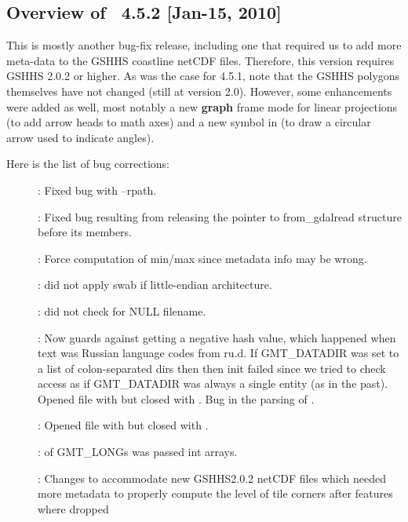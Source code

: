 \subsection{Overview of \gmt\ 4.5.2 [Jan-15, 2010]}

This is mostly another bug-fix release, including one that required us to add more meta-data
to the GSHHS coastline netCDF files.  Therefore, this version requires GSHHS 2.0.2 or higher.
As was the case for 4.5.1, note that the GSHHS polygons themselves have not changed (still at version 2.0).
However, some enhancements were added as well, most notably a new {\bf graph} frame mode for linear
projections (to add arrow heads to math axes) and a new symbol in  (to draw a
circular arrow used to indicate angles).

Here is the list of bug corrections:
\begin{description}
	\item []:	Fixed bug with --rpath.
	\item []:	Fixed bug resulting from releasing the pointer to from\_gdalread
		structure before its members.
	\item []:	Force computation of min/max since metadata info may be wrong.
	\item []:	 did not apply swab if little-endian architecture.
	\item []:	 did not check for NULL filename.
	\item []:	Now guards against getting a negative hash value, which happened
		when text was Russian language codes from ru.d.  If GMT\_DATADIR was set to a list of colon-separated dirs
		then then init failed since we tried to check access as
		if GMT\_DATADIR was always a single entity (as in the past). Opened file with  but closed with .
		Bug in the parsing of .
	\item []:	Opened file with  but closed with .
	\item []:	 of GMT\_LONGs was passed int arrays.
	\item []:		Changes to accommodate new GSHHS2.0.2 netCDF files
		which needed more metadata to properly compute the
		level of tile corners after features where dropped

\end{description}
